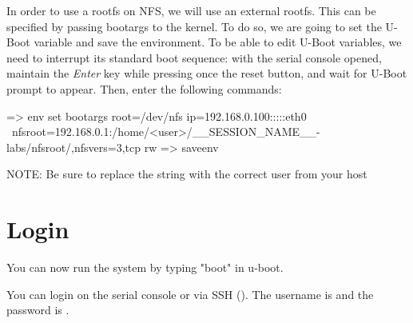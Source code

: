 In order to use a rootfs on NFS, we will use an external rootfs. This can be
specified by passing bootargs to the kernel. To do so, we are going to set the
 U-Boot variable and save the environment. To be able to edit
U-Boot variables, we need to interrupt its standard boot sequence: with the
serial console opened, maintain the {\em Enter} key while pressing once the reset button,
and wait for U-Boot prompt to appear. Then, enter the following commands:

\begin{bashinput}
=> env set bootargs root=/dev/nfs ip=192.168.0.100:::::eth0 \
  nfsroot=192.168.0.1:/home/<user>/__SESSION_NAME__-labs/nfsroot/,nfsvers=3,tcp rw
=> saveenv
\end{bashinput}

NOTE: Be sure to replace the  string with the correct user
from your host

\section{Login}

You can now run the system by typing "boot" in u-boot.

You can login on the serial console or via SSH (). The username is  and the password
is \code{root}.

